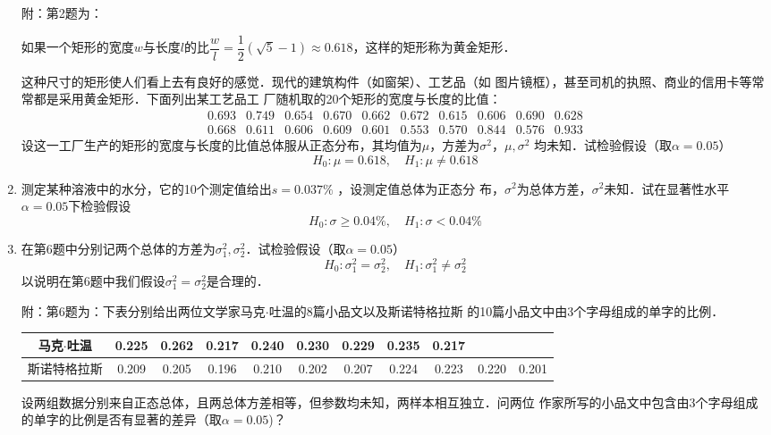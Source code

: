 \documentclass[10pt,a4paper]{article}
\begin{document}
\begin{enumerate}
    {\kaishu 附：第2题为：    \begin{spacing}{1.5}
        如果一个矩形的宽度$w$与长度$l$的比$\dfrac{w}{l}=\dfrac{1}{2}(\sqrt{5}-1)\approx 0.618$，这样的矩形称为黄金矩形．
        \end{spacing}
        这种尺寸的矩形使人们看上去有良好的感觉．现代的建筑构件（如窗架）、工艺品（如
        图片镜框），甚至司机的执照、商业的信用卡等常常都是采用黄金矩形．下面列出某工艺品工
        厂随机取的20个矩形的宽度与长度的比值：
        $$\begin{array}{cccccccccc}
            0.693 & 0.749 & 0.654 & 0.670 & 0.662  & 0.672 &  0.615 &  0.606 & 0.690 & 0.628\\
            0.668 & 0.611 & 0.606 & 0.609  & 0.601 & 0.553 & 0.570  & 0.844 &  0.576 &  0.933 
        \end{array}$$
        设这一工厂生产的矩形的宽度与长度的比值总体服从正态分布，其均值为$\mu$，方差为$\sigma^2$，$\mu,\sigma^2$
        均未知．试检验假设（取$\alpha=0.05$）
        $$H_0:\mu=0.618,\quad H_1:\mu\neq 0.618$$}




    \item 测定某种溶液中的水分，它的10个测定值给出$s=0.037\%$ ，设测定值总体为正态分
    布，$\sigma^2$为总体方差，$\sigma^2$未知．试在显著性水平$\alpha=0.05$下检验假设
    $$H_0:\sigma\geq 0.04\%,\quad H_1:\sigma<0.04\%$$




    \item 在第6题中分别记两个总体的方差为$\sigma_1^2,\sigma_2^2$．试检验假设（取$\alpha=0.05$）
    $$H_0:\sigma_1^2=\sigma_2^2, \quad H_1:\sigma_1^2\neq \sigma^2_2$$
    以说明在第6题中我们假设$\sigma_1^2=\sigma_2^2$是合理的．
    
    {\kaishu 附：第6题为：下表分别给出两位文学家马克$\cdot$吐温的8篇小品文以及斯诺特格拉斯
    的10篇小品文中由3个字母组成的单字的比例．
    \renewcommand{\arraystretch}{1.3}
    \begin{table}[H]\centering
        \begin{tabular}{c|cccccccccc}
        马克$\cdot$吐温 & 0.225 & 0.262 & 0.217 & 0.240 & 0.230 & 0.229 & 0.235 & 0.217 &  &  \\ \hline
        斯诺特格拉斯 & 0.209 & 0.205 & 0.196 & 0.210 & 0.202 & 0.207 & 0.224 & 0.223 & 0.220 & 0.201
    \end{tabular}
    \end{table}
    \renewcommand{\arraystretch}{1.0}
    设两组数据分别来自正态总体，且两总体方差相等，但参数均未知，两样本相互独立．问两位
    作家所写的小品文中包含由3个字母组成的单字的比例是否有显著的差异（取$\alpha=0.05$)？}





\end{enumerate}
\end{document}
